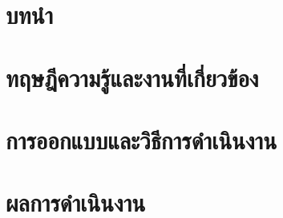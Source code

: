 \documentclass[a4paper,oneside]{cpe-thesis-th}
\begin{document}


\chapter{บทนำ}






\chapter{ทฤษฎีความรู้และงานที่เกี่ยวข้อง}






\chapter{การออกแบบและวิธีการดำเนินงาน}









\chapter{ผลการดำเนินงาน}








\end{document}

